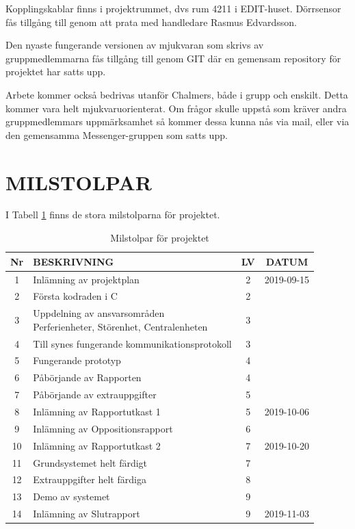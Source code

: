 \documentclass[a4paper]{article}
\begin{document}
Kopplingskablar finns i projektrummet, dvs rum 4211 i EDIT-huset. Dörrsensor fås tillgång till genom att prata med handledare Rasmus Edvardsson.

Den nyaste fungerande versionen av mjukvaran som skrivs av gruppmedlemmarna fås tillgång till genom GIT där en gemensam repository för projektet har satts upp.

Arbete kommer också bedrivas utanför Chalmers, både i grupp och enskilt. Detta kommer vara helt mjukvaruorienterat. Om frågor skulle uppstå som kräver andra gruppmedlemmars uppmärksamhet så kommer dessa kunna nås via mail, eller via den gemensamma Messenger-gruppen som satts upp.

\section{MILSTOLPAR}
\label{sec:milstolpar}

I Tabell \ref{tab:milstolpar} finns de stora milstolparna för projektet.

	\begin{table}[htbp]
	\begin{tabular}{|c|l|c|c|}
		\hline
		Nr & BESKRIVNING & LV & DATUM \\ \hline \hline

		1 & Inlämning av projektplan & 2 & 2019-09-15 \\ \hline
		2 & Första kodraden i C & 2 & \\ \hline
		3 & \pbox{20cm}{Uppdelning av ansvarsområden \\ Perferienheter, Störenhet, Centralenheten} & 3 & \\ \hline
		4 & Till synes fungerande kommunikationsprotokoll & 3 & \\ \hline
		5 & Fungerande prototyp & 4 & \\ \hline
		6 & Påbörjande av Rapporten & 4 & \\ \hline
		7 & Påbörjande av extrauppgifter & 5 & \\ \hline
		8 & Inlämning av Rapportutkast 1 & 5 & 2019-10-06 \\ \hline
		9 & Inlämning av Oppositionsrapport &6 & \\ \hline
		10 & Inlämning av Rapportutkast 2 & 7 & 2019-10-20 \\ \hline
		11 & Grundsystemet helt färdigt & 7 & \\ \hline
		12 & Extrauppgifter helt färdiga & 8 & \\ \hline
		13 & Demo av systemet & 9 & \\ \hline
		14 & Inlämning av Slutrapport & 9 & 2019-11-03 \\ \hline
	\end{tabular}
	\caption{Milstolpar för projektet}
	\label{tab:milstolpar}
\end{table}
\end{document}
